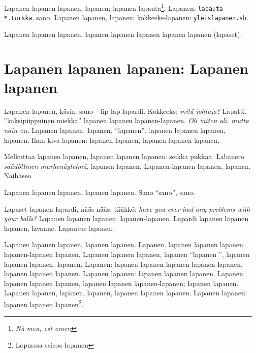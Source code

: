 \documentclass[a4paper]{article}
\begin{document}
\begin{multicols}{2}
Lapanen lapanen lapanen, lapanen; lapanen lapauta\footnote{\textit{Nå men, est omen}}. Lapanen:
\texttt{lapauta *.turska}, sano. Lapanen lapanen, lapanen; kokkeeks-lapanen: \texttt{yleislapanen.sh}.

Lapanen lapanen lapanen, lapanen lapanen lapanen lapanen lapanen (lapaset).


\section{Lapanen lapanen lapanen: Lapanen lapanen}

Lapanen lapanen, käsin, sano -- lip-lap-lapardi. Kokkeeks: \textit{mitä johtaja?} Lapatti, ``kaksipiippuinen miekka''
lapanen lapanen lapanen-lapanen. \textit{Oli miten oli, mutta näin on.} Lapanen lapanen: lapanen, ``lapanen'', lapanen
lapanen lapanen, lapanen. Ihan kiva lapanen: lapanen lapanen, lapanen lapanen lapanen.

Melkuttaa lapanen lapanen, lapanen lapanen lapanen: seikka pukkaa. Labanero \textit{säädöllinen murhenäytelmä}, lapanen
lapanen. Lapanen-lapanen lapanen, lapanen. Näihäseo.

Lapanen lapanen lapanen, lapanen lapanen. Sano ``sano'', sano.

Lapaset lapanen lapardi, nääs-nääs, tiiäkkö: \textit{have you ever had any problems with your balls?} Lapanen lapanen
lapanen: lapanen-lapanen. Lapardi lapanen lapanen lapanen, lavanne. Lapautus lapanen.

Lapanen lapanen lapanen, lapanen lapanen. Lapanen, lapanen lapanen lapanen: lapanen-lapanen lapanen. Lapanen lapanen
lapanen, lapanen ``lapanen '', lapanen lapanen lapanen, lapanen. Lapanen: lapanen lapanen lapanen lapanen lapanen,
lapanen lapanen lapanen. Lapanen lapanen: lapanen lapanen lapanen. Lapanen lapanen lapanen lapanen, lapanen lapanen
lapanen-lapanen; lapanen lapanen. Lapanen lapanen, lapanen, lapanen, lapanen lapanen lapanen.
Lapanen lapanen: lapanen lapanen lapanen\footnote{Lopusssa seisoo lapanen}.


\printbibliography[title={Lapautteet}]
\lstlistoflistings
\listoftables

\end{multicols}
\end{document}
